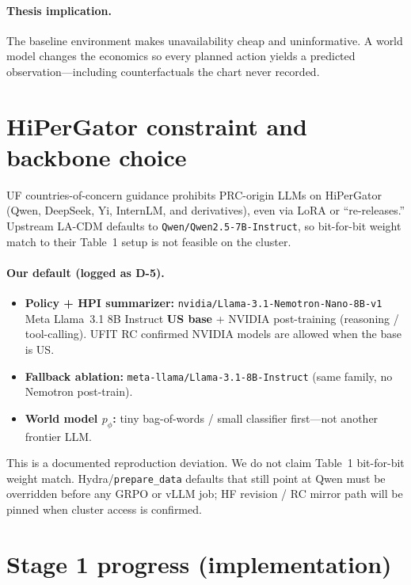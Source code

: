 \documentclass[11pt,letterpaper]{article}
\begin{document}
\paragraph{Thesis implication.}
The baseline environment makes unavailability cheap and uninformative. A world model changes the economics so every planned action yields a predicted observation---including counterfactuals the chart never recorded.

\section{HiPerGator constraint and backbone choice}

UF countries-of-concern guidance prohibits PRC-origin LLMs on HiPerGator (Qwen, DeepSeek, Yi, InternLM, and derivatives), even via LoRA or ``re-releases.'' Upstream LA-CDM defaults to \texttt{Qwen/Qwen2.5-7B-Instruct}, so bit-for-bit weight match to their Table~1 setup is not feasible on the cluster.

\paragraph{Our default (logged as D-5).}
\begin{itemize}
  \item \textbf{Policy + HPI summarizer:} \texttt{nvidia/Llama-3.1-Nemotron-Nano-8B-v1}\\
  Meta Llama~3.1 8B Instruct \textbf{US base} + NVIDIA post-training (reasoning / tool-calling). UFIT RC confirmed NVIDIA models are allowed when the base is US.
  \item \textbf{Fallback ablation:} \texttt{meta-llama/Llama-3.1-8B-Instruct} (same family, no Nemotron post-train).
  \item \textbf{World model \(p_\phi\):} tiny bag-of-words / small classifier first---not another frontier LLM.
\end{itemize}

This is a documented reproduction deviation. We do not claim Table~1 bit-for-bit weight match. Hydra/\texttt{prepare\_data} defaults that still point at Qwen must be overridden before any GRPO or vLLM job; HF revision / RC mirror path will be pinned when cluster access is confirmed.

\section{Stage 1 progress (implementation)}
\end{document}
